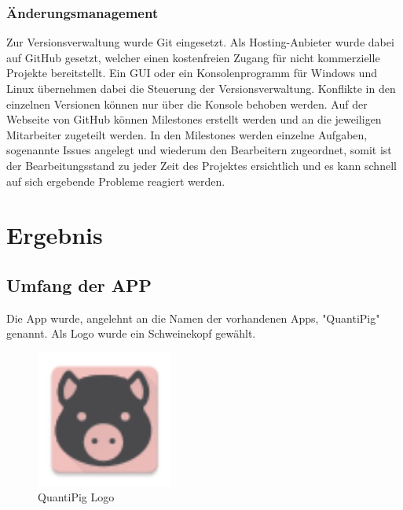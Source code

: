
\subsubsection{Änderungsmanagement}
Zur Versionsverwaltung wurde Git eingesetzt. Als Hosting-Anbieter wurde dabei auf GitHub gesetzt, welcher einen kostenfreien Zugang für nicht kommerzielle Projekte bereitstellt. Ein \ac{GUI} oder ein Konsolenprogramm für Windows und Linux übernehmen dabei die Steuerung der Versionsverwaltung. Konflikte in den einzelnen Versionen können nur über die Konsole behoben werden. Auf der Webseite von GitHub können Milestones erstellt werden und an die jeweiligen Mitarbeiter zugeteilt werden. In den Milestones werden einzelne Aufgaben, sogenannte Issues angelegt und wiederum den Bearbeitern zugeordnet, somit ist der Bearbeitungsstand zu jeder Zeit des Projektes ersichtlich und es kann schnell auf sich ergebende Probleme reagiert werden.




\section{Ergebnis}
\subsection{Umfang der APP}
Die App wurde, angelehnt an die Namen der vorhandenen Apps, "QuantiPig" genannt. Als Logo wurde ein Schweinekopf gewählt.
\begin{figure}[h]
	\centering
		\includegraphics[width=0.4\textwidth]{img/ic_launcher.png}
	\caption[QuantiPig Logo]{QuantiPig Logo}
	\label{fig:pig_logo}
\end{figure}

